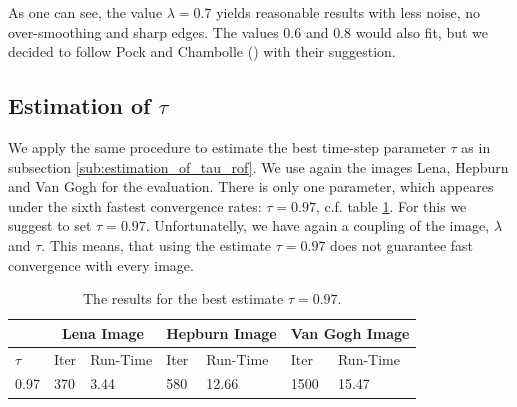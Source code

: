 \documentclass{scrreprt}
\begin{document}
            As one can see, the value $\lambda = 0.7$ yields reasonable results with less noise, no over-smoothing and sharp edges. The values $0.6$ and $0.8$ would also fit, but we decided to follow Pock and Chambolle (\cite{Chambolle10afirst-order}) with their suggestion.


            \subsection{Estimation of $\tau$} %
            \label{sub:estimation_of_tau_tvl1}
                
                We apply the same procedure to estimate the best time-step parameter $\tau$ as in subsection \ref{sub:estimation_of_tau_rof}. We use again the images Lena, Hepburn and Van Gogh for the evaluation. There is only one parameter, which appeares under the sixth fastest convergence rates: $\tau = 0.97$, c.f. table \ref{tab:best_tau_compare_tvl1}. For this we suggest to set $\tau = 0.97$. Unfortunatelly, we have again a coupling of the image, $\lambda$ and $\tau$. This means, that using the estimate $\tau = 0.97$ does not guarantee fast convergence with every image.

                \begin{table}[!ht]
                    \parbox{\linewidth}{
                    \centering
                        \begin{tabular}{| l | l | l | l | l | l | l |}
                            \hline
                            & \multicolumn{2}{|c|}{Lena Image} & \multicolumn{2}{|c|}{Hepburn Image} & \multicolumn{2}{|c|}{Van Gogh Image} \\ \hline\hline
                            $\tau$ & Iter & Run-Time & Iter & Run-Time & Iter & Run-Time \\ \hline
                            0.97 & 370 & 3.44 & 580 & 12.66 & 1500 & 15.47 \\ \hline
                        \end{tabular}
                    }
                    \caption[Best estimate of $\tau$ for the TVL1 model.]{The results for the best estimate $\tau = 0.97$.}
                    \label{tab:best_tau_compare_tvl1}
                \end{table}
\end{document}

